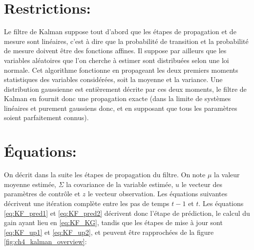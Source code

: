 \section{Restrictions:}
Le filtre de Kalman suppose tout d'abord que les étapes de propagation et de mesure sont linéaires, c'est à dire que la probabilité de transition et la probabilité de mesure doivent être des fonctions affines. Il suppose par ailleurs que les variables aléatoires que l'on cherche à estimer sont distribuées selon une loi normale. Cet algorithme fonctionne en propageant les deux premiers moments statistiques des variables considérées, soit la moyenne et la variance. Une distribution gaussienne est entièrement décrite par ces deux moments, le filtre de Kalman en fournit donc une propagation exacte (dans la limite de systèmes linéaires et purement gaussiens donc, et en supposant que tous les paramètres soient parfaitement connus).

\section{Équations:}
On décrit dans la suite les étapes de propagation du filtre. On note $\mu$ la valeur moyenne estimée, $\Sigma$ la covariance de la variable estimée, $u$ le vecteur des paramètres de contrôle et $z$ le vecteur observation. Les équations suivantes décrivent une itération complète entre les pas de temps $t-1$ et $t$. Les équations \ref{eq:KF_pred1} et \ref{eq:KF_pred2} décrivent donc l'étape de prédiction, le calcul du gain ayant lieu en \ref{eq:KF_KG}, tandis que les étapes de mise à jour sont \ref{eq:KF_up1} et \ref{eq:KF_up2}, et peuvent être rapprochées de la figure \ref{fig:ch4_kalman_overview}: 

